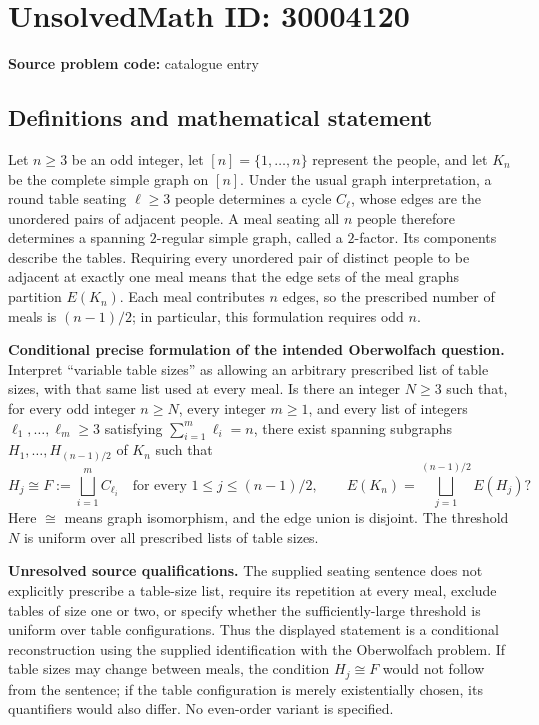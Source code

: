 \documentclass[11pt]{article}
\begin{document}
\section*{UnsolvedMath ID: 30004120}
\textbf{Source problem code:} catalogue entry
\subsection{Definitions and mathematical statement}
Let \(n\geq 3\) be an odd integer, let \([n]=\{1,\ldots,n\}\) represent the people, and let \(K_n\) be the complete simple graph on \([n]\). Under the usual graph interpretation, a round table seating \(\ell\geq 3\) people determines a cycle \(C_\ell\), whose edges are the unordered pairs of adjacent people. A meal seating all \(n\) people therefore determines a spanning \(2\)-regular simple graph, called a \(2\)-factor. Its components describe the tables. Requiring every unordered pair of distinct people to be adjacent at exactly one meal means that the edge sets of the meal graphs partition \(E(K_n)\). Each meal contributes \(n\) edges, so the prescribed number of meals is \((n-1)/2\); in particular, this formulation requires odd \(n\).

\textbf{Conditional precise formulation of the intended Oberwolfach question.} Interpret ``variable table sizes'' as allowing an arbitrary prescribed list of table sizes, with that same list used at every meal. Is there an integer \(N\geq 3\) such that, for every odd integer \(n\geq N\), every integer \(m\geq 1\), and every list of integers \(\ell_1,\ldots,\ell_m\geq 3\) satisfying \(\sum_{i=1}^{m}\ell_i=n\), there exist spanning subgraphs \(H_1,\ldots,H_{(n-1)/2}\) of \(K_n\) such that
\[
H_j\cong F:=\bigsqcup_{i=1}^{m}C_{\ell_i}
\quad\text{for every }1\leq j\leq (n-1)/2,
\qquad
E(K_n)=\bigsqcup_{j=1}^{(n-1)/2}E(H_j)?
\]
Here \(\cong\) means graph isomorphism, and the edge union is disjoint. The threshold \(N\) is uniform over all prescribed lists of table sizes.

\textbf{Unresolved source qualifications.} The supplied seating sentence does not explicitly prescribe a table-size list, require its repetition at every meal, exclude tables of size one or two, or specify whether the sufficiently-large threshold is uniform over table configurations. Thus the displayed statement is a conditional reconstruction using the supplied identification with the Oberwolfach problem. If table sizes may change between meals, the condition \(H_j\cong F\) would not follow from the sentence; if the table configuration is merely existentially chosen, its quantifiers would also differ. No even-order variant is specified.
\end{document}

